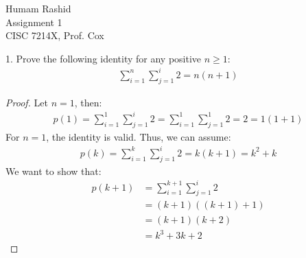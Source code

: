 \documentclass{scrartcl}
\begin{document}
\begin{flushleft}

    Humam Rashid\\
    Assignment 1\\
    CISC 7214X, Prof. Cox\\
    \bigskip
    
    1. Prove the following identity for any positive $n \geq 1$:
    \begin{align*}
        \sum_{i=1}^{n}\sum_{j=1}^{i} 2 = n (n + 1)
    \end{align*}

    \begin{proof}
        Let $n = 1$, then:
        \begin{align}
            p(1) = \sum_{i=1}^{1}\sum_{j=1}^{i} 2 = \sum_{i=1}^{1}\sum_{j=1}^{1} 2 = 2 = 1 (1 + 1)
        \end{align}
        For $n = 1$, the identity is valid. Thus, we can assume:
        \begin{align}
            p(k) = \sum_{i=1}^{k}\sum_{j=1}^{i} 2 = k (k + 1) = k^2 + k
        \end{align}
        We want to show that:
        \begin{align}
            p(k + 1) &= \sum_{i=1}^{k + 1}\sum_{j=1}^{i} 2 \\
                     &= (k + 1) ((k + 1) + 1) \\
                     &= (k + 1) (k + 2) \\
                     &= k^3 + 3k + 2
        \end{align}
    \end{proof}

\end{flushleft}
\end{document}
